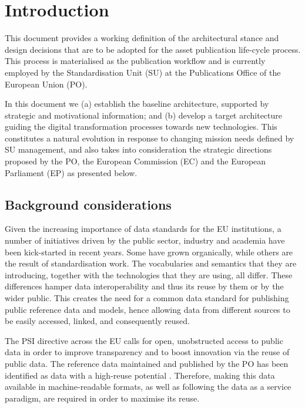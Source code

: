 \section{Introduction}
\label{sec:introduction}

	
	This document provides a working definition of the architectural stance and design decisions that are to be adopted for the asset publication life-cycle process. This process is materialised as the publication workflow and is currently employed by the Standardisation Unit (SU) at the Publications Office of the European Union (PO).
	
	In this document we (a) establish the baseline architecture, supported by  strategic and motivational information; and (b) develop a target architecture guiding the digital transformation processes towards new technologies. This constitutes a natural evolution in response to changing mission needs defined by SU management, and also takes into consideration the strategic directions proposed by the PO, the European Commission (EC) and the European Parliament (EP) as presented below.
	
	\subsection{Background considerations}
	
	Given the increasing importance of data standards for the EU institutions, a number of initiatives driven by the public sector, industry and academia have been kick-started in recent years. Some have grown organically, while others are the result of standardisation work. The vocabularies and semantics that they are introducing, together with the technologies that they are using, all differ. These differences hamper data interoperability and thus its reuse by them or by the wider public. This creates the need for a common data standard for publishing public reference data and models, hence allowing data from different sources to be easily accessed, linked, and consequently reused.
	
	The PSI directive \cite{directive-2019/1024} across the EU calls for open, unobstructed access to public data in order to improve transparency and to boost innovation via the reuse of public data. The reference data maintained and published by the PO has been identified as data with a high-reuse potential \cite{d-high-value-assets}. Therefore, making this data available in machine-readable formats, as well as following the data as a service paradigm, are required in order to maximise its reuse.
	
